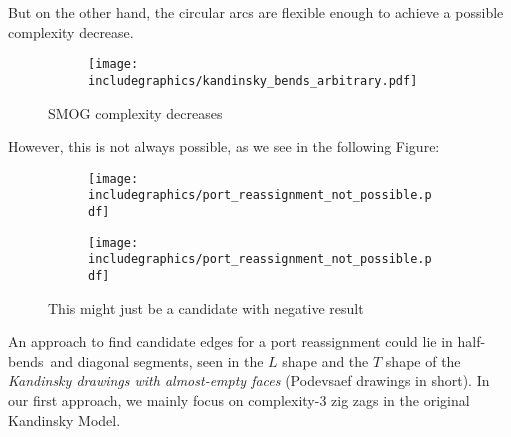 But on the other hand, the circular arcs are flexible enough to achieve a possible complexity decrease.
\begin{figure}[H]
	\centering
	\begin{subfigure}{0.6\linewidth}
		\centering
		\texttt{[image: includegraphics/kandinsky\_bends\_arbitrary.pdf]}
	\end{subfigure}
	\caption{SMOG complexity decreases}
\end{figure}
However, this is not always possible, as we see in the following Figure:
\begin{figure}[H]
	\centering
	\begin{subfigure}{0.45\linewidth}
		\centering
		\texttt{[image: includegraphics/port\_reassignment\_not\_possible.pdf]}
		\caption{}
	\end{subfigure}
	\begin{subfigure}{0.45\linewidth}
		\centering
		\texttt{[image: includegraphics/port\_reassignment\_not\_possible.pdf]}
		\caption{}
	\end{subfigure}
	\caption{This might just be a candidate with negative result}\label{im:port_reassignment_not_possible}
\end{figure}
An approach to find candidate edges for a port reassignment could lie in \grqq half-bends\grqq~and diagonal segments, seen in the $L$ shape and the $T$ shape of the \textit{Kandinsky drawings with almost-empty faces} (Podevsaef drawings in short). In our first approach, we mainly focus on complexity-3 zig zags in the original Kandinsky Model.
